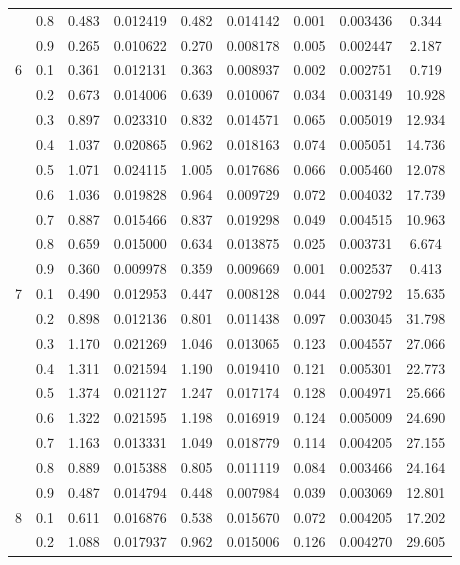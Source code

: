 \begin{longtable}{ | c | c || c | c | c | c | c | c | c | }
 & 0.8 & 0.483 & 0.012419 & 0.482 & 0.014142 & 0.001 & 0.003436 & 0.344 \\
 & 0.9 & 0.265 & 0.010622 & 0.270 & 0.008178 & 0.005 & 0.002447 & 2.187 \\
 \hline
\multirow{9}{*}{6} & 0.1 & 0.361 & 0.012131 & 0.363 & 0.008937 & 0.002 & 0.002751 & 0.719 \\
 & 0.2 & 0.673 & 0.014006 & 0.639 & 0.010067 & 0.034 & 0.003149 & 10.928 \\
 & 0.3 & 0.897 & 0.023310 & 0.832 & 0.014571 & 0.065 & 0.005019 & 12.934 \\
 & 0.4 & 1.037 & 0.020865 & 0.962 & 0.018163 & 0.074 & 0.005051 & 14.736 \\
 & 0.5 & 1.071 & 0.024115 & 1.005 & 0.017686 & 0.066 & 0.005460 & 12.078 \\
 & 0.6 & 1.036 & 0.019828 & 0.964 & 0.009729 & 0.072 & 0.004032 & 17.739 \\
 & 0.7 & 0.887 & 0.015466 & 0.837 & 0.019298 & 0.049 & 0.004515 & 10.963 \\
 & 0.8 & 0.659 & 0.015000 & 0.634 & 0.013875 & 0.025 & 0.003731 & 6.674 \\
 & 0.9 & 0.360 & 0.009978 & 0.359 & 0.009669 & 0.001 & 0.002537 & 0.413 \\
 \hline
\multirow{9}{*}{7} & 0.1 & 0.490 & 0.012953 & 0.447 & 0.008128 & 0.044 & 0.002792 & 15.635 \\
 & 0.2 & 0.898 & 0.012136 & 0.801 & 0.011438 & 0.097 & 0.003045 & 31.798 \\
 & 0.3 & 1.170 & 0.021269 & 1.046 & 0.013065 & 0.123 & 0.004557 & 27.066 \\
 & 0.4 & 1.311 & 0.021594 & 1.190 & 0.019410 & 0.121 & 0.005301 & 22.773 \\
 & 0.5 & 1.374 & 0.021127 & 1.247 & 0.017174 & 0.128 & 0.004971 & 25.666 \\
 & 0.6 & 1.322 & 0.021595 & 1.198 & 0.016919 & 0.124 & 0.005009 & 24.690 \\
 & 0.7 & 1.163 & 0.013331 & 1.049 & 0.018779 & 0.114 & 0.004205 & 27.155 \\
 & 0.8 & 0.889 & 0.015388 & 0.805 & 0.011119 & 0.084 & 0.003466 & 24.164 \\
 & 0.9 & 0.487 & 0.014794 & 0.448 & 0.007984 & 0.039 & 0.003069 & 12.801 \\
 \hline
\multirow{9}{*}{8} & 0.1 & 0.611 & 0.016876 & 0.538 & 0.015670 & 0.072 & 0.004205 & 17.202 \\
 & 0.2 & 1.088 & 0.017937 & 0.962 & 0.015006 & 0.126 & 0.004270 & 29.605 \\

\end{longtable}

